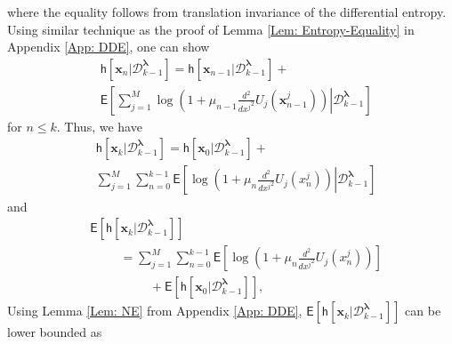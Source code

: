 \documentclass[10pt,twocolumn,twoside]{IEEEtran}
\begin{document}
where the equality follows from translation invariance of the differential entropy. Using similar technique as the proof of Lemma \ref{Lem: Entropy-Equality} in Appendix \ref{App: DDE}, one can show
\begin{align}
&{\ensuremath{\mathsf{h}\left[\left.{{\ensuremath{\boldsymbol{{x}}}}_{n}}\right|{\mathcal{D}^{{\ensuremath{\boldsymbol{{\lambda}}}}}_{k-1}}\right]}}={\ensuremath{\mathsf{h}\left[\left.{{\ensuremath{\boldsymbol{{x}}}}_{n-1}}\right|{\mathcal{D}^{{\ensuremath{\boldsymbol{{\lambda}}}}}_{k-1}}\right]}}+\nonumber\\
&\mathsf{E}\left[\sum_{j=1}^M\log\left(1+\mu_{n-1}\left.\frac{d ^2}{d {x^j}^2}U_{j}\left({\ensuremath{\boldsymbol{{x}}}}^{j}_{n-1}\!\right)\right)\right|\mathcal{D}^{{\ensuremath{\boldsymbol{{\lambda}}}}}_{k-1}\right]
\end{align}
for $n\leq k$. Thus, we have
\begin{align}
&{\ensuremath{\mathsf{h}\left[\left.{{\ensuremath{\boldsymbol{{x}}}}_{k}}\right|{\mathcal{D}^{{\ensuremath{\boldsymbol{{\lambda}}}}}_{k-1}}\right]}}={\ensuremath{\mathsf{h}\left[\left.{{\ensuremath{\boldsymbol{{x}}}}_{0}}\right|{\mathcal{D}^{{\ensuremath{\boldsymbol{{\lambda}}}}}_{k-1}}\right]}}+\nonumber\\
&\sum_{j=1}^M\sum_{n=0}^{k-1}{\ensuremath{\mathsf{E}\left[\left.{{\ensuremath{\log{\left({{1+\mu_n\frac{d ^2}{d {x^j}^2}U_{j}{\left({x^{j}_{n}}\right)}}}\right)}}}}\right|{\mathcal{D}^{{\ensuremath{\boldsymbol{{\lambda}}}}}_{k-1}}\right]}}
\end{align}
and
\begin{align}
&{\ensuremath{\mathsf{E}\left[{{\ensuremath{\mathsf{h}\left[\left.{{\ensuremath{\boldsymbol{{x}}}}_{k}}\right|{\mathcal{D}^{{\ensuremath{\boldsymbol{{\lambda}}}}}_{k-1}}\right]}}} \right]}}\nonumber\\
&\hspace{1cm}=\sum_{j=1}^M\sum_{n=0}^{k-1}{\ensuremath{\mathsf{E}\left[{{\ensuremath{\log{\left({{1+\mu_n\frac{d ^2}{d {x^j}^2}U_{j}{\left({x^{j}_{n}}\right)}}}\right)}}}} \right]}}\nonumber\\
&\hspace{2cm}+{\ensuremath{\mathsf{E}\left[{{\ensuremath{\mathsf{h}\left[\left.{{\ensuremath{\boldsymbol{{x}}}}_{0}}\right|{\mathcal{D}^{{\ensuremath{\boldsymbol{{\lambda}}}}}_{k-1}}\right]}}} \right]}},
\end{align}
Using Lemma \ref{Lem: NE} from Appendix \ref{App: DDE}, ${\ensuremath{\mathsf{E}\left[{{\ensuremath{\mathsf{h}\left[\left.{{\ensuremath{\boldsymbol{{x}}}}_{k}}\right|{\mathcal{D}^{{\ensuremath{\boldsymbol{{\lambda}}}}}_{k-1}}\right]}}} \right]}}$ can be lower bounded as
\end{document}

